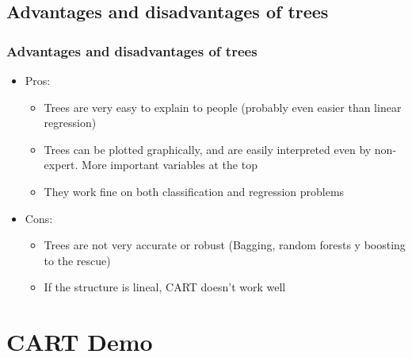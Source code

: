 \documentclass[
  shownotes,
  xcolor={svgnames},
  hyperref={colorlinks,citecolor=DarkBlue,linkcolor=DarkRed,urlcolor=DarkBlue}
  ]{beamer}
\begin{document}
\subsection{Advantages and disadvantages of trees}
\begin{frame}[fragile]
\frametitle{Advantages and disadvantages of trees}

\begin{itemize}
\item Pros: 
  \begin{itemize}
    \item Trees are very easy to explain to people (probably even easier than linear regression)
    \item Trees can be plotted graphically, and are easily interpreted even by non-expert. More important variables at the top
    \item They work fine on both classification and regression problems
  \end{itemize}

\item  Cons:
  \begin{itemize}
    \item Trees are not very accurate or robust (Bagging, random forests y boosting to the rescue)
    \item If the structure is lineal, CART doesn't work well
  \end{itemize}
\end{itemize}

\end{frame}

\section{CART Demo}
\end{document}
